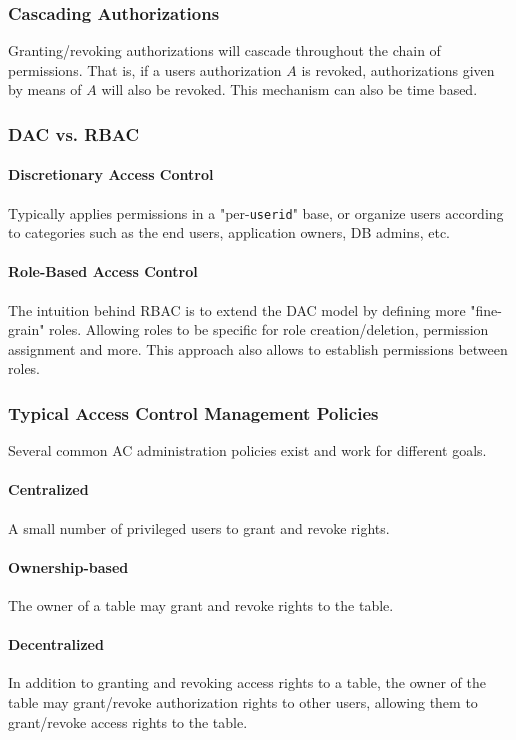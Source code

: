 \subsubsection{Cascading Authorizations}
Granting/revoking authorizations will cascade throughout the chain of permissions.
That is, if a users authorization $A$ is revoked,
authorizations given by means of $A$ will also be revoked.
This mechanism can also be time based.

\subsubsection{DAC vs. RBAC}
\paragraph{Discretionary Access Control}
Typically applies permissions in a "per-\texttt{userid}" base,
or organize users according to categories such as the end users, application owners, DB admins, etc.

\paragraph{Role-Based Access Control}
The intuition behind RBAC is to extend the DAC model by defining more "fine-grain" roles.
Allowing roles to be specific for role creation/deletion, permission assignment and more.
This approach also allows to establish permissions between roles.

\subsubsection{Typical Access Control Management Policies}
Several common AC administration policies exist and work for different goals.

\paragraph{Centralized}
A small number of privileged users to grant and revoke rights.

\paragraph{Ownership-based}
The owner of a table may grant and revoke rights to the table.

\paragraph{Decentralized}
In addition to granting and revoking access rights to a table,
the owner of the table may grant/revoke authorization rights to other users,
allowing them to grant/revoke access rights to the table.

